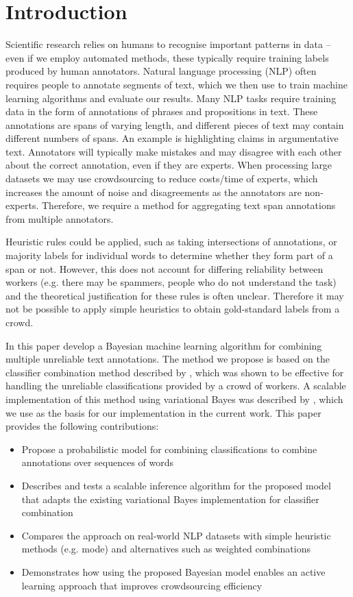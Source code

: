 \section{Introduction}\label{sec:intro}

Scientific research relies on humans to recognise important patterns in data – even if we employ automated methods, these typically require training labels produced by human annotators. 
Natural language processing (NLP) often requires people to annotate segments of text, which we then use to train machine learning algorithms and evaluate our results.
Many NLP tasks require training data in the form of annotations of phrases and propositions in text. These annotations are spans of varying length, and different pieces of text may contain different numbers of spans. An example is highlighting claims in argumentative text. Annotators will typically make mistakes and may disagree with each other about the correct annotation, even if they are experts. When processing large datasets we may use crowdsourcing to reduce costs/time of experts, which increases the amount of noise and disagreements as the annotators are non-experts. Therefore, we require a method for aggregating text span annotations from multiple annotators.

Heuristic rules could be applied, such as taking intersections of annotations, or majority labels for individual words to determine whether they form part of a span or not. However, this does not account for differing reliability between workers (e.g. there may be spammers, people who do not understand the task) and the theoretical justification for these rules is often unclear. Therefore it may not be possible to apply simple heuristics to obtain gold-standard labels from a crowd. 

In this paper develop a Bayesian machine learning algorithm for combining multiple unreliable text annotations.
The method we propose is based on the classifier combination method described by \cite{kim2012bayesian}, 
which was shown to be effective for handling the unreliable classifications provided by a crowd of workers. A scalable implementation of this method using variational Bayes was described by \cite{simpsonlong}, which we use as the basis for our implementation in the current work. This paper provides the following contributions:
\begin{itemize}
  \item Propose a probabilistic model for combining classifications to combine annotations over sequences of words
  \item Describes and tests a scalable inference algorithm for the proposed model that adapts the existing variational Bayes implementation for classifier combination
  \item Compares the approach on real-world NLP datasets with simple heuristic methods (e.g. mode) and alternatives such as weighted combinations
  \item Demonstrates how using the proposed Bayesian model enables an active learning approach that improves crowdsourcing efficiency
\end{itemize}

